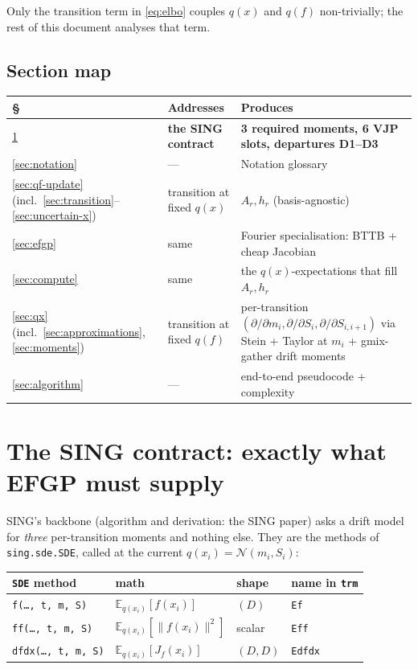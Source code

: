\documentclass[11pt]{article}
\newcommand{\Eqx}{\mathbb{E}_{q(x_i)}}
\newcommand{\code}[1]{\texttt{\small #1}}
\begin{document}
Only the transition term in \eqref{eq:elbo} couples $q(x)$ and $q(f)$
non-trivially; the rest of this document analyses that term.

\subsection*{Section map}

\begin{center}
\begin{tabular}{@{}l l p{}@{}}
\hline
\S & Addresses & Produces \\
\hline
\ref{sec:interface} & \textbf{the SING contract} &
  \textbf{3 required moments, 6 VJP slots, departures D1--D3} \\
\ref{sec:notation} & — & Notation glossary \\
\ref{sec:qf-update} (incl.\ \ref{sec:transition}–\ref{sec:uncertain-x}) & transition at fixed $q(x)$ &
  $A_r, h_r$ (basis-agnostic) \\
\ref{sec:efgp} & same & Fourier specialisation: BTTB + cheap Jacobian \\
\ref{sec:compute} & same &
  the $q(x)$-expectations that fill $A_r, h_r$ \\
\ref{sec:qx} (incl.\ \ref{sec:approximations},\ref{sec:moments}) & transition at fixed $q(f)$ &
  per-transition $(\partial/\partial m_i,\partial/\partial S_i,\partial/\partial S_{i,i+1})$
  via Stein + Taylor at $m_i$ + gmix-gather drift moments \\
\ref{sec:algorithm} & — & end-to-end pseudocode + complexity \\
\hline
\end{tabular}
\end{center}

\section{The SING contract: exactly what EFGP must supply}
\label{sec:interface}

SING's backbone (algorithm and derivation: the SING paper) asks a drift
model for \emph{three} per-transition moments and nothing else. They are
the methods of \code{sing.sde.SDE}, called at the current
$q(x_i)=\mathcal{N}(m_i,S_i)$:

\begin{center}
\renewcommand{\arraystretch}{1.2}
\begin{tabular}{llll}
\hline
\code{SDE} method & math & shape & name in \code{trm} \\\hline
\code{f(\ldots, t, m, S)}    & $\Eqx[f(x_i)]$          & $(D)$   & \code{Ef}    \\
\code{ff(\ldots, t, m, S)}   & $\Eqx[\|f(x_i)\|^2]$    & scalar  & \code{Eff}   \\
\code{dfdx(\ldots, t, m, S)} & $\Eqx[J_f(x_i)]$        & $(D,D)$ & \code{Edfdx} \\\hline
\end{tabular}
\end{center}
\end{document}
